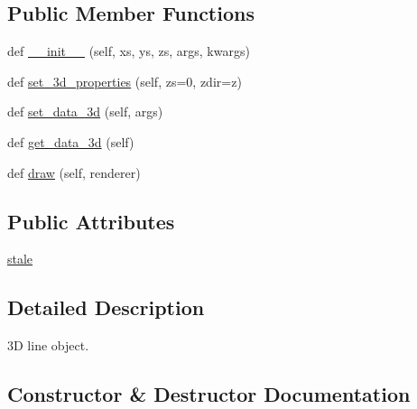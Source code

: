 \subsection*{Public Member Functions}
\begin{DoxyCompactItemize}
\item 
def \hyperlink{classmplot3d_1_1art3d_1_1Line3D_aabc648a6001ff1fc28ec378093a169df}{\+\_\+\+\_\+init\+\_\+\+\_\+} (self, xs, ys, zs, args, kwargs)
\item 
def \hyperlink{classmplot3d_1_1art3d_1_1Line3D_a617721c7b5450e6dab10ceac5c925d5b}{set\+\_\+3d\+\_\+properties} (self, zs=0, zdir=\textquotesingle{}z\textquotesingle{})
\item 
def \hyperlink{classmplot3d_1_1art3d_1_1Line3D_a75760a18ed269dbdbf35654a78993e35}{set\+\_\+data\+\_\+3d} (self, args)
\item 
def \hyperlink{classmplot3d_1_1art3d_1_1Line3D_a048e22553a327bc88e5c9ae493babcf2}{get\+\_\+data\+\_\+3d} (self)
\item 
def \hyperlink{classmplot3d_1_1art3d_1_1Line3D_ac6822908784395454ed00289cb61b4ce}{draw} (self, renderer)
\end{DoxyCompactItemize}
\subsection*{Public Attributes}
\begin{DoxyCompactItemize}
\item 
\hyperlink{classmplot3d_1_1art3d_1_1Line3D_aef7747f46acbc890c6a2336bc406fd26}{stale}
\end{DoxyCompactItemize}


\subsection{Detailed Description}
\begin{DoxyVerb}3D line object.
\end{DoxyVerb}
 

\subsection{Constructor \& Destructor Documentation}
\mbox{\label{classmplot3d_1_1art3d_1_1Line3D_aabc648a6001ff1fc28ec378093a169df}} 
